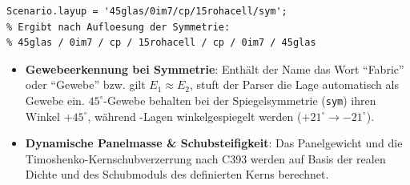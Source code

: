 \begin{lstlisting}[style=vscodeLightMatlab]
% Beispiel in 01_Functions/Scenariodata.m:
Scenario.layup = '45glas/0im7/cp/15rohacell/sym';
% Ergibt nach Aufloesung der Symmetrie:
% 45glas / 0im7 / cp / 15rohacell / cp / 0im7 / 45glas
\end{lstlisting}

\begin{tcolorbox}[colback=infobg,colframe=infoblue,arc=2mm,title=\textbf{Automatisierte Parser-Intelligenz}]
\begin{itemize}
    \item \textbf{Gewebeerkennung bei Symmetrie}: Enthält der Name das Wort "`Fabric"' oder "`Gewebe"' bzw. gilt $E_1 \approx E_2$, stuft der Parser die Lage automatisch als Gewebe ein. $45^\circ$-Gewebe behalten bei der Spiegelsymmetrie (\texttt{sym}) ihren Winkel $+45^\circ$, während -Lagen winkelgespiegelt werden ($+21^\circ \to -21^\circ$).
    \item \textbf{Dynamische Panelmasse \& Schubsteifigkeit}: Das Panelgewicht und die Timoshenko-Kernschubverzerrung nach  C393 werden auf Basis der realen Dichte und des Schubmoduls des definierten Kerns berechnet.
\end{itemize}
\end{tcolorbox}
